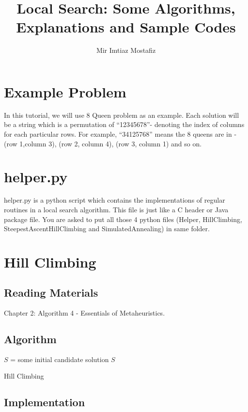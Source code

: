 \documentclass{article}
\title{\textbf{Local Search: Some Algorithms, Explanations and Sample Codes}}
\author{Mir Imtiaz Mostafiz}
\date{}
\begin{document}
\maketitle

\section{Example Problem}
In this tutorial, we will use 8 Queen problem as an example. Each solution will be a string which is a permutation of ``12345678''- denoting the index of columns for each particular rows. For example, ``34125768'' means the 8 queens are in - (row 1,column 3), (row 2, column 4), (row 3, column 1) and so on.
\section{helper.py}
helper.py is a python script which contains the implementations of regular routines in a local search algorithm. This file is just like a C header or Java package file. You are asked to put all those 4 python files (Helper, HillClimbing, SteepestAscentHillClimbing and SimulatedAnnealing) in same folder. 

 
  \section{Hill Climbing}
  \subsection{Reading Materials}
  Chapter 2: Algorithm 4 - Essentials of Metaheuristics.
  \subsection{Algorithm}  \begin{algorithm}
  $S$ = some initial candidate solution\;
     \Return $S$\;
  
  \caption{Hill Climbing}
  \label{algo:hill}
  \end{algorithm}

  \subsection{Implementation}
\end{document}
